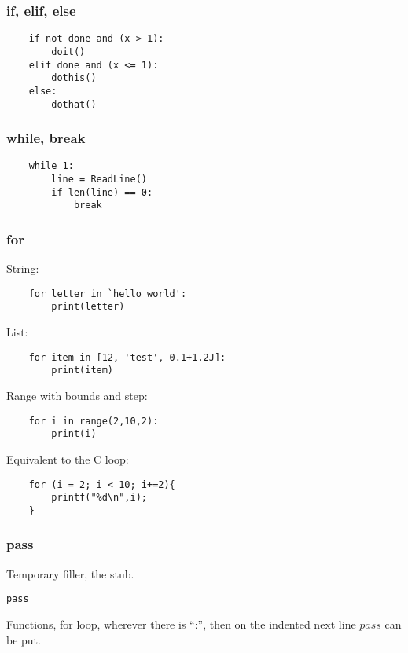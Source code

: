 \begin{frame}[fragile]\frametitle{if, elif, else}
  \begin{lstlisting}
	if not done and (x > 1):
		doit()
	elif done and (x <= 1):
		dothis()
	else:
		dothat()
  \end{lstlisting}
\end{frame}

\begin{frame}[fragile]\frametitle{while, break}
  \begin{lstlisting}
	while 1:
		line = ReadLine()
		if len(line) == 0:
			break
  \end{lstlisting}
\end{frame}

\begin{frame}[fragile]\frametitle{for}
String:
  \begin{lstlisting}
	for letter in `hello world':
		print(letter)
  \end{lstlisting}
  List:
  \begin{lstlisting}
	for item in [12, 'test', 0.1+1.2J]:
		print(item)
  \end{lstlisting}
 Range with bounds and step:		
  \begin{lstlisting}
	for i in range(2,10,2):
		print(i)
  \end{lstlisting}
  Equivalent to the C loop:
    \begin{lstlisting}
	for (i = 2; i < 10; i+=2){
		printf("%d\n",i);
	}
  \end{lstlisting}
\end{frame}

\begin{frame}[fragile]\frametitle{pass}
Temporary filler, the stub.
  \begin{lstlisting}
pass
  \end{lstlisting}
  Functions, for loop, wherever there is ``:'', then on the indented next line $pass$ can be put.
\end{frame}

